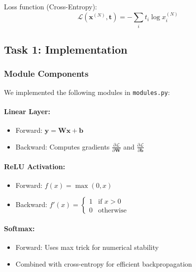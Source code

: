 \documentclass[11pt,a4paper]{article}
\begin{document}
Loss function (Cross-Entropy):
\begin{equation}
\mathcal{L}(\mathbf{x}^{(N)}, \mathbf{t}) = -\sum_{i} t_i \log x^{(N)}_i
\end{equation}

\subsection{Task 1: Implementation}

\subsubsection{Module Components}
We implemented the following modules in \texttt{modules.py}:

\paragraph{Linear Layer:}
\begin{itemize}
    \item Forward: $\mathbf{y} = \mathbf{W}\mathbf{x} + \mathbf{b}$
    \item Backward: Computes gradients $\frac{\partial \mathcal{L}}{\partial \mathbf{W}}$ and $\frac{\partial \mathcal{L}}{\partial \mathbf{b}}$
\end{itemize}

\paragraph{ReLU Activation:}
\begin{itemize}
    \item Forward: $f(x) = \max(0, x)$
    \item Backward: $f'(x) = \begin{cases} 1 & \text{if } x > 0 \\ 0 & \text{otherwise} \end{cases}$
\end{itemize}

\paragraph{Softmax:}
\begin{itemize}
    \item Forward: Uses max trick for numerical stability
    \item Combined with cross-entropy for efficient backpropagation
\end{itemize}
\end{document}
